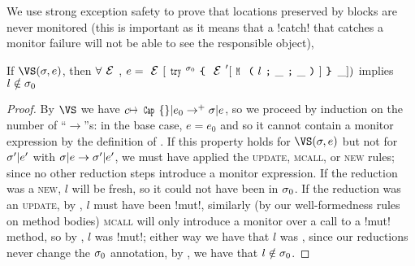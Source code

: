 We use strong exception safety to prove that locations preserved by \Q@try@ blocks are never monitored (this is important as it means that a \Q!catch! that catches a monitor failure will not be able to see the responsible object),%
\SS\begin{Lemma}\rm
	If $\VS(\s, e)$, then $\forall \E$, $e = \E[\Kw{try}^{\s_0}\oC\E'[\M{l}{\_}{\_}]\cC\,\_])$ implies $l\notin\sigma_0$
\end{Lemma}\SS
\begin{proof}
By $\VS$ we have $c\mapsto\Kw{Cap}\{\}|e_0\rightarrow^+ \s|e$, so we proceed by induction on the number of ``$\rightarrow$''s: in the base case, $e = e_0$ and so it cannot contain a monitor expression by the definition of \VS. If this property holds for $\VS(\s, e)$ but not for $\sigma'|e'$ with $\sigma|e\rightarrow \sigma'|e'$, we must have applied the \textsc{update}, \textsc{mcall}, or \textsc{new} rules; since no other reduction steps introduce a monitor expression. If the reduction was a \textsc{new}, $l$ will be fresh, so it could not have been in $\sigma_0$. If the reduction was an \textsc{update}, by , $l$ must have been \Q!mut!, similarly (by our well-formedness rules on method bodies) \textsc{mcall} will only introduce a monitor over a call to a \Q!mut! method, so by , $l$ was \Q!mut!; either way we have that $l$ was \muty, since our reductions never change the $\sigma_0$ annotation, by , we have that $l \notin \sigma_0$.
\end{proof}

